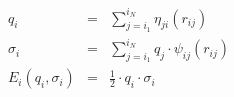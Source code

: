 


\begin{eqnarray*}
q_i & = & \sum_{j=i_1}^{i_N} \eta_{ji}\left(r_{ij}\right) \\
\sigma_i & = & \sum_{j=i_1}^{i_N} q_j \cdot \psi_{ij} \left(r_{ij}\right) \\
E_i\left(q_i,\sigma_i\right) & = & \frac{1}{2} \cdot q_i \cdot \sigma_i
\end{eqnarray*}


